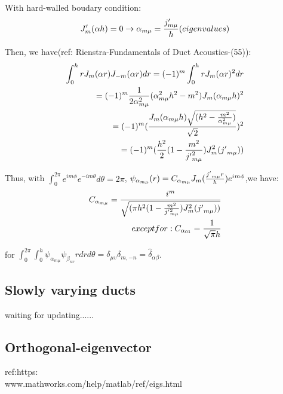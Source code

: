 \documentclass{Note}
\begin{document}
With hard-walled boudary condition:
\begin{equation}
\begin{aligned}
J_m'(\alpha h)=0 \rightarrow \alpha_{m\mu}={{j'_{m\mu}}\over h} (eigenvalues)
\end{aligned}
\end{equation}

Then, we have(ref: Rienstra-Fundamentals of Duct Acoustics-(55)):
\begin{equation}
\begin{aligned}
\int_0^h  r J_m(\alpha r)  J_{-m}(\alpha r)dr=(-1)^m\int_0^h  r J_m(\alpha r)^2 dr\\
=(-1)^m 
{1\over 2\alpha_{m\mu}^2}(\alpha_{m\mu}^2h^2-m^2)J_m(\alpha_{m\mu} h)^2\\
=(-1)^m 
({J_m(\alpha_{m\mu} h)\sqrt{(h^2-{m^2\over \alpha_{m\mu}^2} )}\over \sqrt{2}})^2\\
=(-1)^m 
({{h^2\over 2}(1-{m^2\over {j'}_{m\mu}^2} )}J^2_m({j'}_{m\mu}))\\
\end{aligned}
\end{equation}

Thus, with $\int_0^{2\pi} e^{im\phi}e^{-im\theta}  d\theta=2\pi$,
$\psi_{\alpha_{m\mu}}(r)=C_{\alpha_{m\mu}}J_m({{j'}_{m\mu} r\over h})e^{im\phi}$,we have:
\begin{equation}
\begin{aligned}
C_{\alpha_{m\mu}}={i^m\over \sqrt{({{\pi h^2}(1-{m^2\over {j'}_{m\mu}^2} )}J^2_m({j'}_{m\mu}))}}\\
except for:
C_{\alpha_{01}}={1 \over \sqrt{\pi}h}
\end{aligned}
\end{equation}

for 
 $\int_0^{2\pi}\int_0^h \psi_{\alpha_{m\mu}} \psi_{\beta_{nv}} r dr d\theta=\delta_{\mu v} \delta_{m,-n} =\widehat{\delta }_{\alpha\beta}$.


\subsection{Slowly varying ducts}

waiting for updating......

\subsection{Orthogonal-eigenvector}
 ref:https:\\www.mathworks.com/help/matlab/ref/eigs.html
 
\end{document}
